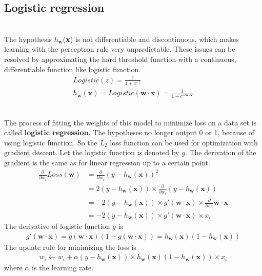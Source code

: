 \documentclass{article}
\begin{document}
\subsection{Logistic regression}
\begin{paragraph}
\\
The hypothesis $h_\textbf{w}$(\textbf{x}) is not differentiable and discontinuous, which makes learning with the perceptron rule very unpredictable. These issues can be resolved by approximating the hard threshold function with a continuous, differentiable function like logistic function.
\begin{align*}
    Logistic(z) = \frac{1}{1 + e^{-z}} \\
   h_\textbf{w}(\textbf{x}) = Logistic(\textbf{w}\cdot\textbf{x}) = \frac{1}{1 + e^{-\textbf{w}\cdot\textbf{x}}} 
\end{align*}
\end{paragraph}
\begin{paragraph}
\\
The process of fitting the weights of this model to minimize loss on a data set is called \textbf{logistic regression}. The hypotheses no longer output 0 or 1, because of using logistic function. So the $L_2$ loss function can be used for optimization with gradient descent. Let the logistic function is denoted by $g$. The derivation of the gradient is the same as for linear regression up to a certain point.
\begin{align*}
    \frac{\partial}{\partial w_i}Loss(\textbf{w}) & = \frac{\partial}{\partial w_i}(y - h_\textbf{w}(\textbf{x}))^2 \\
& = 2(y - h_\textbf{w}(\textbf{x}))\times\frac{\partial}{\partial w_i}(y - h_\textbf{w}(\textbf{x})) \\
& = -2(y - h_\textbf{w}(\textbf{x})) \times g'(\textbf{w}\cdot\textbf{x})\times\frac{\partial}{\partial w_i}\textbf{w}\cdot\textbf{x} \\
& = -2(y - h_\textbf{w}(\textbf{x})) \times g'(\textbf{w}\cdot\textbf{x}) \times x_i
\end{align*}
The derivative of logistic function $g$ is
\begin{align*}
   g'(\textbf{w}\cdot\textbf{x}) = g(\textbf{w}\cdot\textbf{x})(1 - g(\textbf{w}\cdot\textbf{x})) = h_\textbf{w}(\textbf{x})(1 - h_\textbf{w}(\textbf{x}))
\end{align*}
The update rule for minimizing the loss is
\begin{align*}
    w_i \leftarrow w_i + \alpha(y - h_\textbf{w}(\textbf{x})) \times h_\textbf{w}(\textbf{x})(1 - h_\textbf{w}(\textbf{x})) \times x_i 
\end{align*}
where $\alpha$ is the learning rate. 
\end{paragraph}
\end{document}
